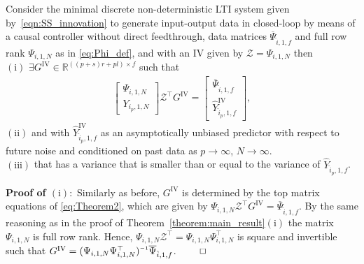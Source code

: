 \begin{thm}\label{theorem:main_result_IVs}
    Consider the minimal discrete non-deterministic \ac{LTI} system given by~\eqref{eqn:SS_innovation} to generate input-output data in closed-loop by means of a causal controller without direct feedthrough, data matrices $\overline{\Psi}_{\hat{i},1,f}$ and full row rank $\Psi_{i,1,N}$ as in \eqref{eq:Phi_def}, and with an \ac{IV} given by $\mathcal{Z}=\Psi_{i,1,N}$ then\\
    $\mathrm{(i)}$ $\exists G^\mathrm{IV}\in\mathbb{R}^{((p+s)r+pl)\times f}$ such that
    \begin{align}\label{eq:Theorem2}
        \begin{bmatrix}
            \Psi_{i,1,N}\\Y_{i_p,1,N}
        \end{bmatrix}\mathcal{Z}^\top G^\mathrm{IV} =
        \begin{bmatrix}
            \overline{\Psi}_{\hat{i},1,f}\\\widehat{Y}_{\hat{i}_p,1,f}^\mathrm{IV}
        \end{bmatrix},
    \end{align}
    $\mathrm{(ii)}$ and with $\widehat{Y}_{\hat{i}_p,1,f}^\mathrm{IV}$ as an asymptotically unbiased predictor with respect to future noise and conditioned on past data as $p\rightarrow\infty$, $N\rightarrow\infty$.\\
    $\mathrm{(iii)}$ that has a variance that is smaller than or equal to the variance of $\widehat{Y}_{\hat{i}_p,1,f}$.
\end{thm}
\textbf{Proof of $\mathrm{(i)}:$} Similarly as before, $G^\mathrm{IV}$ is determined by the top matrix equations of \eqref{eq:Theorem2}, which are given by $\Psi_{i,1,N}\mathcal{Z}^\top G^\mathrm{IV}=\overline{\Psi}_{\hat{i},1,f}$. By the same reasoning as in the proof of Theorem~\ref{theorem:main_result}$\mathrm{(i)}$ the matrix $\Psi_{i,1,N}$ is full row rank. Hence, $\Psi_{i,1,N}\mathcal{Z}^\top=\Psi_{i,1,N}\Psi_{i,1,N}^\top$ is square and invertible such that $G^\mathrm{IV} = (\Psi_{i,1,N}\Psi_{i,1,N}^\top)\inv \overline{\Psi}_{\hat{i},1,f}$. $\hfill \qed$\\
